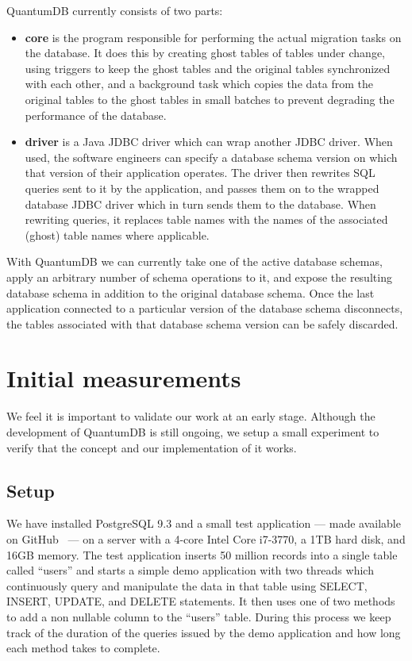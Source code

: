 \documentclass[conference]{IEEEtran}
\begin{document}
QuantumDB currently consists of two parts: 
\begin{itemize}
  \item{\textbf{core} is the program responsible for performing the actual migration tasks on the database. It does this by creating ghost tables of tables under change, using triggers to keep the ghost tables and the original tables synchronized with each other, and a background task which copies the data from the original tables to the ghost tables in small batches to prevent degrading the performance of the database.}
  \item{\textbf{driver} is a Java JDBC driver which can wrap another JDBC driver. When used, the software engineers can specify a database schema version on which that version of their application operates. The driver then rewrites SQL queries sent to it by the application, and passes them on to the wrapped database JDBC driver which in turn sends them to the database. When rewriting queries, it replaces table names with the names of the associated (ghost) table names where applicable.}
\end{itemize}

With QuantumDB we can currently take one of the active database schemas, apply an arbitrary number of schema operations to it, and expose the resulting database schema in addition to the original database schema. Once the last application connected to a particular version of the database schema disconnects, the tables associated with that database schema version can be safely discarded.

\section{Initial measurements} %

We feel it is important to validate our work at an early stage. Although the development of QuantumDB is still ongoing, we setup a small experiment to verify that the concept and our implementation of it works. 

\subsection{Setup}
We have installed PostgreSQL 9.3 and a small test application --- made available on GitHub~\cite{QuantumDB-RelEng-Demo} --- on a server with a 4-core Intel Core i7-3770, a 1TB hard disk, and 16GB memory. The test application inserts 50 million records into a single table called ``users'' and starts a simple demo application with two threads which continuously query and manipulate the data in that table using SELECT, INSERT, UPDATE, and DELETE statements. It then uses one of two methods to add a non nullable column to the ``users'' table. During this process we keep track of the duration of the queries issued by the demo application and how long each method takes to complete. 
\end{document}
